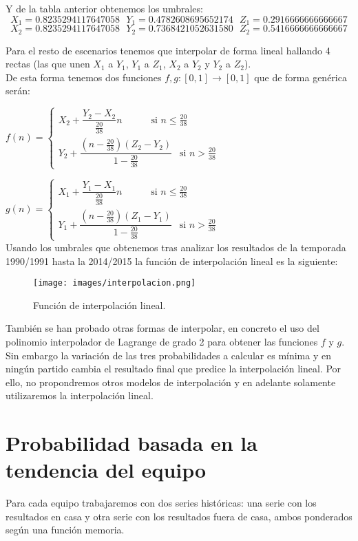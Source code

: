 Y de la tabla anterior obtenemos los umbrales:
$$X_{1}=0.8235294117647058 \ \ \ Y_{1}=0.4782608695652174 \ \ \ Z_{1}=0.2916666666666667$$
$$X_{2}=0.8235294117647058 \ \ \ Y_{2}=0.7368421052631580 \ \ \ Z_{2}=0.5416666666666667$$

Para el resto de escenarios tenemos que interpolar de forma lineal hallando 4 rectas (las que unen $X_{1}$ a $Y_{1}$, $Y_{1}$ a $Z_{1}$, $X_{2}$ a $Y_{2}$ y $Y_{2}$ a $Z_{2}$).\\

De esta forma tenemos dos funciones $f,g:[0,1] \longrightarrow [0,1]$ que de forma genérica serán:

$f(n)= \begin{cases}
X_{2}+\dfrac{Y_{2}-X_{2}}{\frac{20}{38}}n \ \ \ \ \ \ \ \ \ \ \ \ \text{    si } n\leq \frac{20}{38} \\
Y_{2}+\dfrac{(n-\frac{20}{38})(Z_{2}-Y_{2})}{1-\frac{20}{38}} \ \ \text{    si } n > \frac{20}{38}
\end{cases}$

$g(n)= \begin{cases}
X_{1}+\dfrac{Y_{1}-X_{1}}{\frac{20}{38}}n \ \ \ \ \ \ \ \ \ \ \ \ \text{    si } n\leq \frac{20}{38} \\
Y_{1}+\dfrac{(n-\frac{20}{38})(Z_{1}-Y_{1})}{1-\frac{20}{38}} \ \ \text{    si } n > \frac{20}{38}
\end{cases}$
\ \\

Usando los umbrales que obtenemos tras analizar los resultados de la temporada 1990/1991 hasta la 2014/2015 la función de interpolación lineal es la siguiente:

\begin{figure}[H]
	\centering
	\texttt{[image: images/interpolacion.png]}
	\caption{Función de interpolación lineal.}
\end{figure}

También se han probado otras formas de interpolar, en concreto el uso del polinomio interpolador de Lagrange de grado 2 para obtener las funciones $f$ y $g$. Sin embargo la variación de las tres probabilidades a calcular es mínima y en ningún partido cambia el resultado final que predice la interpolación lineal. Por ello, no propondremos otros modelos de interpolación y en adelante solamente utilizaremos la interpolación lineal.  

\section{Probabilidad basada en la tendencia del equipo}
Para cada equipo trabajaremos con dos series históricas: una serie con los resultados en casa y otra serie con los resultados fuera de casa, ambos ponderados según una función memoria.\\

